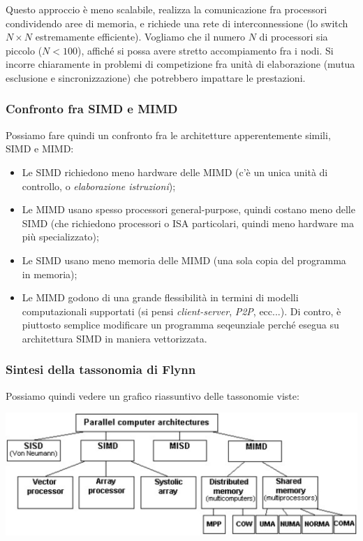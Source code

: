 \documentclass[a4paper,11pt]{article}
\begin{document}
\begin{itemize}
Questo approccio è meno scalabile, realizza la comunicazione fra processori condividendo aree di memoria, e richiede una rete di interconnessione (lo switch $N \times N$ estremamente efficiente).
Vogliamo che il numero $N$ di processori sia piccolo ($N < 100$), affiché si possa avere stretto accompiamento fra i nodi.
Si incorre chiaramente in problemi di competizione fra unità di elaborazione (mutua esclusione e sincronizzazione) che potrebbero impattare le prestazioni.
\end{itemize}

\subsubsection{Confronto fra SIMD e MIMD}
Possiamo fare quindi un confronto fra le architetture apperentemente simili, SIMD e MIMD:
\begin{itemize}
	\item Le SIMD richiedono meno hardware delle MIMD (c'è un unica unità di controllo, o \textit{elaborazione istruzioni});
	\item Le MIMD usano spesso processori general-purpose, quindi costano meno delle SIMD (che richiedono processori o ISA particolari, quindi meno hardware ma più specializzato);
	\item Le SIMD usano meno memoria delle MIMD (una sola copia del programma in memoria);
	\item Le MIMD godono di una grande flessibilità in termini di modelli computazionali supportati (si pensi \textit{client-server}, \textit{P2P}, ecc...). Di contro, è piuttosto semplice modificare un programma seqeunziale perché esegua su architettura SIMD in maniera vettorizzata.
\end{itemize}

\subsubsection{Sintesi della tassonomia di Flynn}
Possiamo quindi vedere un grafico riassuntivo delle tassonomie viste:
\begin{center}
	\includegraphics[scale=0.17]{../figures/flynn.png}
\end{center}
\end{document}
